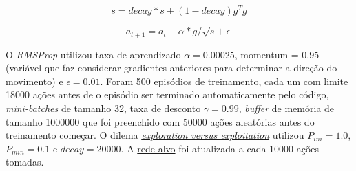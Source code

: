 \begin{equation} \label{eq:gradSum}
s = decay * s + (1 - decay)g^{T}g
\end{equation}

\begin{equation} \label{eq:rmsprop}
a_{t+1} = a_{t} - \alpha * g / \sqrt{s+\epsilon}
\end{equation}

O \textit{RMSProp} utilizou taxa de aprendizado $\alpha = 0.00025$, momentum = $0.95$ (variável que faz considerar gradientes anteriores para determinar a direção do movimento) e $\epsilon = 0.01$.
Foram 500 episódios de treinamento, cada um com limite 18000 ações antes de o episódio ser terminado automaticamente pelo código, \textit{mini-batches} de tamanho 32, taxa de desconto $\gamma = 0.99$, \textit{buffer} de \hyperref[sec:er]{memória} de tamanho 1000000 que foi preenchido com 50000 ações aleatórias antes do treinamento começar.
O dilema \hyperref[eq:exp_exp_prob]{\textit{exploration versus exploitation}} utilizou $P_{ini} = 1.0$, $P_{min} = 0.1$ e $decay = 20000$.
A \hyperref[sec:ft]{rede alvo} foi atualizada a cada 10000 ações tomadas.

